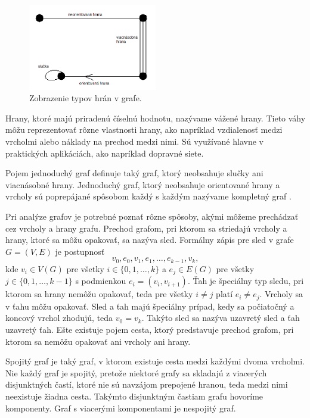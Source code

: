 \begin{figure}
    \centerline{\includegraphics[width=0.5\textwidth]{images/edges.png}}
    \caption[Zobrazenie typov hrán v grafe.]{Zobrazenie typov hrán v grafe.}
    \label{obr:edges}
\end{figure}

Hrany, ktoré majú priradenú číselnú hodnotu, nazývame vážené hrany. Tieto váhy môžu reprezentovať rôzne vlastnosti hrany, 
ako napríklad vzdialenosť medzi vrcholmi alebo náklady na prechod medzi nimi. Sú využívané hlavne v praktických aplikáciách,
ako napríklad dopravné siete.

Pojem jednoduchý graf definuje taký graf, ktorý neobsahuje slučky ani viacnásobné hrany. Jednoduchý graf, ktorý neobsahuje 
orientované hrany a vrcholy sú poprepájané spôsobom každý s každým nazývame kompletný graf \cite{markovsovadynamika} .

Pri analýze grafov je potrebné poznať rôzne spôsoby, akými môžeme prechádzať cez vrcholy a hrany grafu.
Prechod grafom, pri ktorom sa striedajú vrcholy a hrany, ktoré sa môžu opakovať, sa nazýva sled.
Formálny zápis pre sled v grafe $G = (V, E)$ je postupnosť 
\[
v_0, e_0, v_1, e_1, \dots, e_{k-1}, v_{k},
\]
kde $v_i \in V(G)$ pre všetky $i \in \{0, 1, \dots, k\}$ a $e_j \in E(G)$ pre všetky $j \in \{0, 1, \dots, k-1\}$ s podmienkou
$e_i = (v_i, v_{i+1})$. Ťah je špeciálny typ sledu, pri ktorom sa hrany nemôžu opakovať, teda pre všetky $i \neq j$ platí $e_i \neq e_j$.
Vrcholy sa v ťahu môžu opakovať. Sled a ťah majú špeciálny prípad, kedy sa počiatočný a koncový vrchol zhodujú, teda $v_0 = v_k$.
Takýto sled sa nazýva uzavretý sled a ťah uzavretý ťah. Ešte existuje pojem cesta, ktorý predstavuje prechod grafom, pri ktorom sa
nemôžu opakovať ani vrcholy ani hrany.

Spojitý graf je taký graf, v ktorom existuje cesta medzi každými dvoma vrcholmi. Nie každý graf je spojitý, pretože niektoré grafy sa
skladajú z viacerých disjunktných častí, ktoré nie sú navzájom prepojené hranou, teda medzi nimi neexistuje žiadna cesta. Takýmto
disjunktným častiam grafu hovoríme komponenty. Graf s viacerými komponentami je nespojitý graf.

